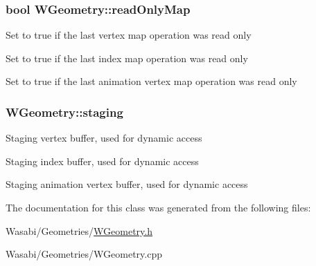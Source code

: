\subsubsection[{\texorpdfstring{read\+Only\+Map}{readOnlyMap}}]{\setlength{\rightskip}{0pt plus 5cm}bool W\+Geometry\+::read\+Only\+Map}\hypertarget{class_w_geometry_acfbe406adf9413c67cf08a2d60061c5d}{}\label{class_w_geometry_acfbe406adf9413c67cf08a2d60061c5d}
Set to true if the last vertex map operation was read only

Set to true if the last index map operation was read only

Set to true if the last animation vertex map operation was read only 
\subsubsection[{\texorpdfstring{staging}{staging}}]{ W\+Geometry\+::staging}\hypertarget{class_w_geometry_a270b11468a7492990fe3df154b981be5}{}\label{class_w_geometry_a270b11468a7492990fe3df154b981be5}
Staging vertex buffer, used for dynamic access

Staging index buffer, used for dynamic access

Staging animation vertex buffer, used for dynamic access 

The documentation for this class was generated from the following files\+:\begin{DoxyCompactItemize}
\item 
Wasabi/\+Geometries/\hyperlink{_w_geometry_8h}{W\+Geometry.\+h}\item 
Wasabi/\+Geometries/W\+Geometry.\+cpp\end{DoxyCompactItemize}
